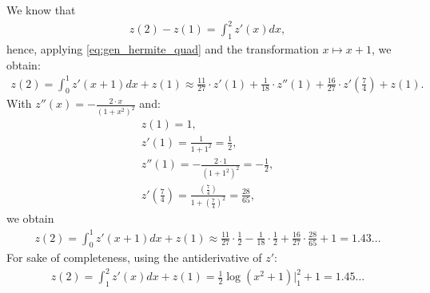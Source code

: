 \begin{problem}
\begin{subproblem}[4]
 \cprotEnv \begin{solution}
  We know that
 \begin{align}
  z(2) - z(1) = \int_1^2 z'(x) dx,
 \end{align}
 hence, applying \eqref{eq:gen_hermite_quad} and the transformation $x \mapsto x + 1$, we obtain:
 \begin{align}
  z(2) = \int_0^1 z'(x + 1) dx + z(1) \approx \frac{11}{27} \cdot z'(1) + \frac{1}{18} \cdot z''(1) + \frac{16}{27} \cdot z'\left(\frac{7}{4}\right) + z(1).
 \end{align}
  With $z''(x) = - \frac{2 \cdot x}{(1 + x^2)^2}$ and:
 \begin{align*}
  z(1) = 1, \\
  z'(1) = \frac{1}{1 + 1^2} = \frac{1}{2}, \\
  z''(1) = - \frac{2 \cdot 1}{(1 + 1^2)^2} = -\frac{1}{2}, \\
  z'\left(\frac{7}{4}\right) = \frac{(\frac{7}{4})}{1 + (\frac{7}{4})^2} = \frac{28}{65},
 \end{align*}
  we obtain
  \begin{align*}
   z(2) = \int_0^1 z'(x + 1) dx + z(1) \approx \frac{11}{27} \cdot \frac{1}{2} - \frac{1}{18} \cdot \frac{1}{2} + \frac{16}{27} \cdot \frac{28}{65} + 1 = 1.43 \dots
  \end{align*}
  For sake of completeness, using the antiderivative of $z'$:
  \begin{align*}
   z(2) = \int_1^2 z'(x) dx + z(1) = \frac{1}{2} \log(x^2 + 1) |_1^2 + 1 = 1.45 \dots
  \end{align*}
 \end{solution}
 
 \end{subproblem}
 
\end{problem}
